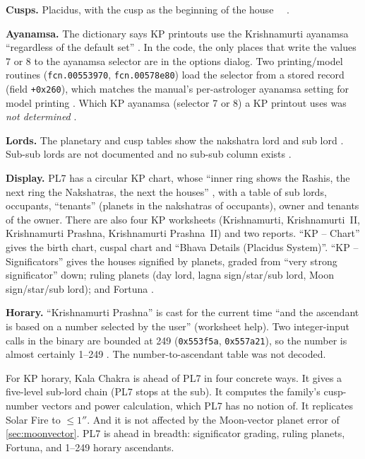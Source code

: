 \textbf{Cusps.} Placidus, with the cusp as the beginning of the house \tagBIN\ \tagDOC\
\parencite[pp.~56, 200]{geovision2006pl7}.

\textbf{Ayanamsa.} The dictionary says KP printouts use the Krishnamurti ayanamsa
``regardless of the default set'' \parencite[pp.~218--219]{geovision2006pl7}. In the code,
the only places that write the values 7 or 8 to the ayanamsa selector are in the options
dialog. Two printing/model routines (\texttt{fcn.00553970}, \texttt{fcn.00578e80}) load the
selector from a stored record (field \texttt{+0x260}), which matches the manual's
per-astrologer ayanamsa setting for model printing \parencite[p.~165]{geovision2006pl7}.
Which KP ayanamsa (selector 7 or 8) a KP printout uses was \emph{not determined} \tagINF.

\textbf{Lords.} The planetary and cusp tables show the nakshatra lord and sub lord
\parencite[p.~145]{geovision2006pl7}. Sub-sub lords are not documented and no sub-sub
column exists \tagDOC.

\textbf{Display.} PL7 has a circular KP chart, whose ``inner ring shows the Rashis, the next
ring the Nakshatras, the next the houses'' \parencite[p.~200]{geovision2006pl7}, with a table
of sub lords, occupants, ``tenants'' (planets in the nakshatras of occupants), owner and
tenants of the owner. There are also four KP worksheets (Krishnamurti, Krishnamurti~II,
Krishnamurti Prashna, Krishnamurti Prashna~II) and two reports. ``KP -- Chart'' gives the
birth chart, cuspal chart and ``Bhava Details (Placidus System)''. ``KP -- Significators''
gives the houses signified by planets, graded from ``very strong significator'' down; ruling
planets (day lord, lagna sign/star/sub lord, Moon sign/star/sub lord); and Fortuna \tagDOC.

\textbf{Horary.} ``Krishnamurti Prashna'' is cast for the current time ``and the ascendant
is based on a number selected by the user'' (worksheet help). Two integer-input calls in the
binary are bounded at 249 (\texttt{0x553f5a}, \texttt{0x557a21}), so the number is almost
certainly 1--249 \tagINF. The number-to-ascendant table was not decoded.

\begin{keybox}\kidea For KP horary, Kala Chakra is ahead of PL7 in four concrete ways. It
gives a five-level sub-lord chain (PL7 stops at the sub). It computes the family's
cusp-number vectors and power calculation, which PL7 has no notion of. It replicates Solar
Fire to $\le 1''$. And it is not affected by the Moon-vector planet error of
\autoref{sec:moonvector}. PL7 is ahead in breadth: significator grading, ruling planets,
Fortuna, and 1--249 horary ascendants.\end{keybox}

